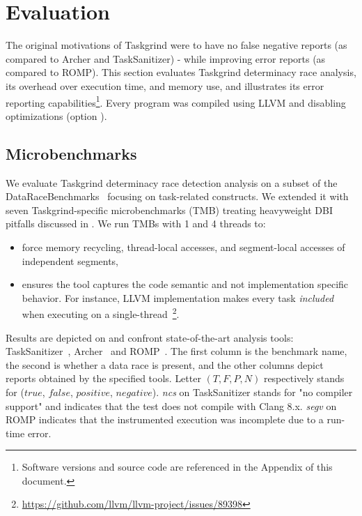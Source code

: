 \section{Evaluation} \label{sec:eval}

The original motivations of Taskgrind were to have no false negative reports (as compared to Archer and TaskSanitizer) - while improving error reports (as compared to ROMP).
This section evaluates Taskgrind determinacy race analysis, its overhead over execution time, and memory use, and illustrates its error reporting capabilities\footnote{Software versions and source code are referenced in the Appendix of this document.}.
Every program was compiled using LLVM and disabling optimizations (option ).

\subsection{Microbenchmarks}
We evaluate Taskgrind determinacy race detection analysis on a subset of the DataRaceBenchmarks~\cite{drb} focusing on task-related constructs.
We extended it with seven Taskgrind-specific microbenchmarks (TMB) treating heavyweight DBI pitfalls discussed in .
We run TMBs with 1 and 4 threads to:
\begin{itemize}
	\item	force memory recycling, thread-local accesses, and segment-local accesses of independent segments,
	\item 	ensures the tool captures the code semantic and not implementation specific behavior.
	For instance, LLVM implementation makes every task \emph{included} when executing on a single-thread~\footnote{\url{https://github.com/llvm/llvm-project/issues/89398}}.
\end{itemize}
Results are depicted on  and confront state-of-the-art analysis tools: TaskSanitizer~\cite{Matar18}, Archer~\cite{archer} and ROMP~\cite{ROMP}.
The first column is the benchmark name, the second is whether a data race is present, and the other columns depict reports obtained by the specified tools.
Letter $(T, F, P, N)$ respectively stands for ($true$, $false$, $positive$, $negative$).
\emph{ncs} on TaskSanitizer stands for "no compiler support" and indicates that the test does not compile with Clang 8.x.
\emph{segv} on ROMP indicates that the instrumented execution was incomplete due to a run-time error.

